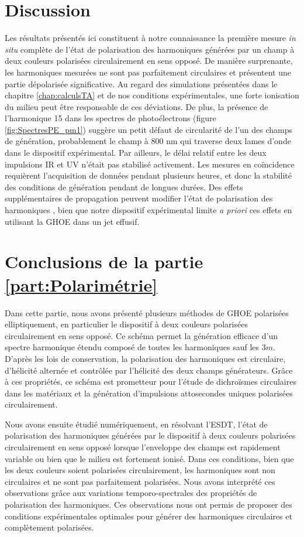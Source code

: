 \section{Discussion}
Les résultats présentés ici constituent à notre connaissance la première mesure \textit{in situ} complète de l'état de polarisation des harmoniques générées par un champ à deux couleurs polarisées circulairement en sens opposé. De manière surprenante, les harmoniques mesurées ne sont pas parfaitement circulaires et présentent une partie dépolarisée significative. Au regard des simulations présentées dans le chapitre \ref{chap:calculsTA} et de nos conditions expérimentales, une forte ionisation du milieu peut être responsable de ces déviations. De plus, la présence de l'harmonique 15 dans les spectres de photoélectrons (figure \ref{fig:SpectresPE_pm1}) suggère un petit défaut de circularité de l'un des champs de génération, probablement le champ à 800 nm qui traverse deux lames d'onde dans le dispositif expérimental. Par ailleurs, le délai relatif entre les deux impulsions IR et UV n'était pas stabilisé activement. Les mesures en coïncidence requièrent l'acquisition de données pendant plusieurs heures, et donc la stabilité des conditions de génération pendant de longues durées. Des effets supplémentaires de propagation peuvent modifier l'état de polarisation des harmoniques , bien que notre dispositif expérimental limite \textit{a priori} ces effets en utilisant la GHOE dans un jet effusif.

\section*{Conclusions de la partie \ref{part:Polarimétrie}}
Dans cette partie, nous avons présenté plusieurs méthodes de GHOE polarisées elliptiquement, en particulier le dispositif à deux couleurs polarisées circulairement en sens opposé. Ce schéma permet la génération efficace d'un spectre harmonique étendu composé de toutes les harmoniques sauf les $3m$. D'après les lois de conservation, la polarisation des harmoniques est circulaire, d'hélicité alternée et contrôlée par l'hélicité des deux champs générateurs. Grâce à ces propriétés, ce schéma est prometteur pour l'étude de dichroïsmes circulaires dans les matériaux et la génération d'impulsions attosecondes uniques polarisées circulairement.

Nous avons ensuite étudié numériquement, en résolvant l'ESDT, l'état de polarisation des harmoniques générées par le dispositif à deux couleurs polarisées circulairement en sens opposé lorsque l'enveloppe des champs est rapidement variable ou bien que le milieu est fortement ionisé. Dans ces conditions, bien que les deux couleurs soient polarisées circulairement, les harmoniques sont non circulaires et ne sont pas parfaitement polarisées. Nous avons interprété ces observations grâce aux variations temporo-spectrales des propriétés de polarisation des harmoniques. Ces observations nous ont permis de proposer des conditions expérimentales optimales pour générer des harmoniques circulaires et complètement polarisées.

